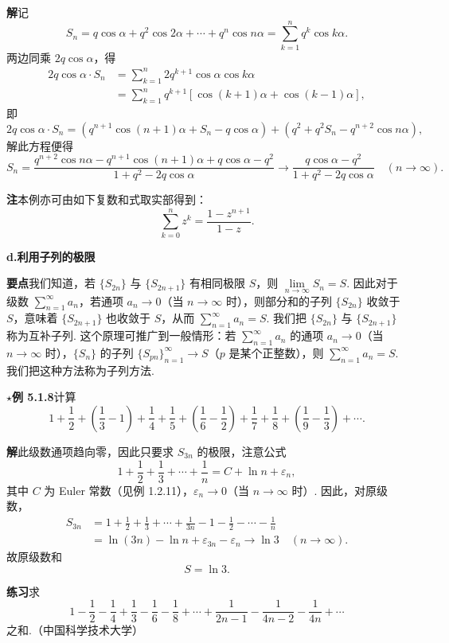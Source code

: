 \documentclass[UTF8, 12pt, fontset=fandol, oneside]{ctexart}
\begin{document}
\noindent\textbf{解}\quad 记
\[
  S_n=q\cos\alpha+q^2\cos2\alpha+\cdots+q^n\cos n\alpha
  =\sum_{k=1}^n q^k\cos k\alpha.
\]
两边同乘 $2q\cos\alpha$，得
\[
\begin{aligned}
2q\cos\alpha\cdot S_n
&=\sum_{k=1}^n 2q^{k+1}\cos\alpha\cos k\alpha\\
&=\sum_{k=1}^n q^{k+1}[\cos(k+1)\alpha+\cos(k-1)\alpha],
\end{aligned}
\]
即
\[
  2q\cos\alpha\cdot S_n
  =\left(q^{n+1}\cos(n+1)\alpha+S_n-q\cos\alpha\right)
   +\left(q^2+q^2S_n-q^{n+2}\cos n\alpha\right),
\]
解此方程便得
\[
  S_n=\frac{q^{n+2}\cos n\alpha-q^{n+1}\cos(n+1)\alpha+q\cos\alpha-q^2}
  {1+q^2-2q\cos\alpha}
  \to \frac{q\cos\alpha-q^2}{1+q^2-2q\cos\alpha}\quad(n\to\infty).
\]

\noindent\textbf{注}\quad 本例亦可由如下复数和式取实部得到：
\[
  \sum_{k=0}^n z^k=\frac{1-z^{n+1}}{1-z}.
\]

\noindent\textbf{d.\quad 利用子列的极限}

\noindent\textbf{要点}\quad 我们知道，若 $\{S_{2n}\}$ 与 $\{S_{2n+1}\}$ 有相同极限 $S$，则 $\lim\limits_{n\to\infty}S_n=S$. 因此对于级数 $\displaystyle\sum_{n=1}^\infty a_n$，若通项 $a_n\to0$（当 $n\to\infty$ 时），则部分和的子列 $\{S_{2n}\}$ 收敛于 $S$，意味着 $\{S_{2n+1}\}$ 也收敛于 $S$，从而 $\displaystyle\sum_{n=1}^\infty a_n=S$. 我们把 $\{S_{2n}\}$ 与 $\{S_{2n+1}\}$ 称为互补子列. 这个原理可推广到一般情形：若 $\displaystyle\sum_{n=1}^\infty a_n$ 的通项 $a_n\to0$（当 $n\to\infty$ 时），$\{S_n\}$ 的子列 $\{S_{pn}\}_{n=1}^\infty\to S$（$p$ 是某个正整数），则 $\displaystyle\sum_{n=1}^\infty a_n=S$. 我们把这种方法称为子列方法.

\noindent\textbf{$\star$例 5.1.8}\quad 计算
\[
  1+\frac12+\left(\frac13-1\right)+\frac14+\frac15+\left(\frac16-\frac12\right)
  +\frac17+\frac18+\left(\frac19-\frac13\right)+\cdots.
\]

\noindent\textbf{解}\quad 此级数通项趋向零，因此只要求 $S_{3n}$ 的极限，注意公式
\[
  1+\frac12+\frac13+\cdots+\frac1n=C+\ln n+\varepsilon_n,
\]
其中 $C$ 为 Euler 常数（见例 1.2.11），$\varepsilon_n\to0$（当 $n\to\infty$ 时）. 因此，对原级数，
\[
\begin{aligned}
S_{3n}
&=1+\frac12+\frac13+\cdots+\frac1{3n}-1-\frac12-\cdots-\frac1n\\
&=\ln(3n)-\ln n+\varepsilon_{3n}-\varepsilon_n\to\ln3\quad(n\to\infty).
\end{aligned}
\]
故原级数和
\[
  S=\ln3.
\]

\noindent\textbf{练习}\quad 求
\[
  1-\frac12-\frac14+\frac13-\frac16-\frac18+\cdots+\frac1{2n-1}
  -\frac1{4n-2}-\frac1{4n}+\cdots
\]
之和.（中国科学技术大学）
\end{document}
